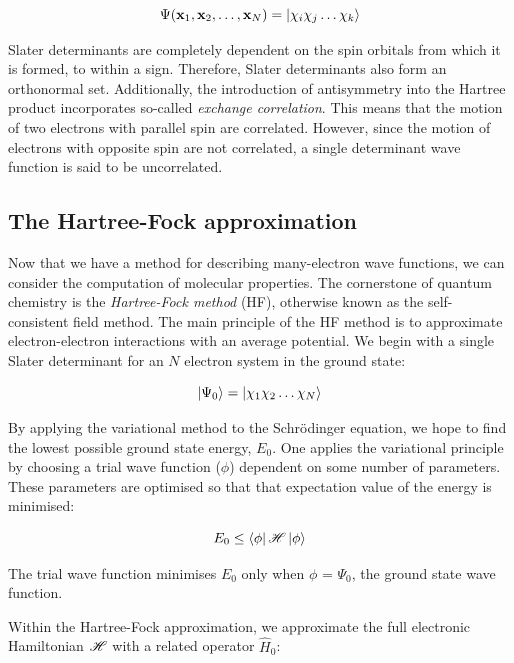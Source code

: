 \begin{equation}
  \Psi(\mathbf{x}_1,\mathbf{x}_2,\dots,\mathbf{x}_N) = \ket{\chi_i\chi_j\dots\chi_k}
\end{equation}

Slater determinants are completely dependent on the spin orbitals from which it is formed, to within a sign. Therefore, Slater determinants also form an orthonormal set. Additionally, the introduction of antisymmetry into the Hartree product incorporates so-called \emph{exchange correlation}. This means that the motion of two electrons with parallel spin are correlated. However, since the motion of electrons with opposite spin are not correlated, a single determinant wave function is said to be uncorrelated.

\subsection{The Hartree-Fock approximation}

Now that we have a method for describing many-electron wave functions, we can consider the computation of molecular properties. The cornerstone of quantum chemistry is the \emph{Hartree-Fock method} (HF), otherwise known as the self-consistent field method. The main principle of the HF method is to approximate electron-electron interactions with an average potential. We begin with a single Slater determinant for an $N$ electron system in the ground state:

\begin{equation}
\ket{\Psi_0} = \ket{\chi_1\chi_2\dots\chi_N}
\end{equation}

\noindent By applying the variational method to the Schr{\"o}dinger equation, we hope to find the lowest possible ground state energy, $E_0$. One applies the variational principle by choosing a trial wave function ($\phi$) dependent on some number of parameters. These parameters are optimised so that that expectation value of the energy is minimised:

\begin{equation}
  E_0 \leq \bra{\phi}\mathscr{H}\ket{\phi}
\end{equation}

\noindent The trial wave function minimises $E_0$ only when $\phi$ = $\Psi_0$, the ground state wave function.

Within the Hartree-Fock approximation, we approximate the full electronic Hamiltonian $\mathscr{H}$ with a related operator $\hat{H}_0$:

